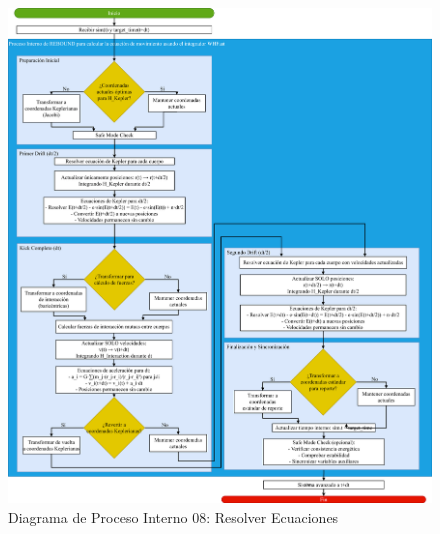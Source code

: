 \begin{figure}[H]
    \centering
    \includegraphics[width=\textwidth]{img/Analisis/DiagramaProcesos/DiagramaProceso08_ResolverEcuaciones.png}
    \caption{Diagrama de Proceso Interno 08: Resolver Ecuaciones}%
    \label{fig:process_diagram08}
\end{figure}

